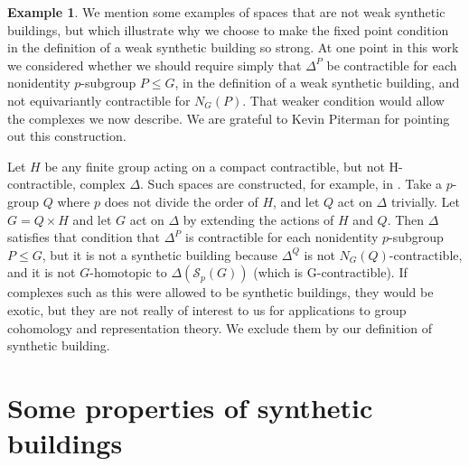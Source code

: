 \documentclass[12pt]{amsart}
\theoremstyle{plain}
\theoremstyle{definition}
\newtheorem{example}[theorem]{Example}
\theoremstyle{remark}
\numberwithin{equation}{section}
\newcommand{\SpCpx}[2]{\Delta(\mathcal{S}_{#2}(#1))}
\begin{document}
\begin{example}
We mention some examples of spaces that are not weak synthetic buildings, but which illustrate why we choose to make the fixed point condition in the definition of a weak synthetic building so strong. At one point in this work we considered whether we should require simply that $\Delta^P$ be contractible for each nonidentity $p$-subgroup $P\le G$, in the definition of a weak synthetic building, and not equivariantly contractible for $N_G(P)$. That weaker condition would allow the complexes we now describe. We are grateful to Kevin Piterman for pointing out this construction.

 Let $H$ be any finite group acting on a compact contractible, but not H-contractible, complex $\Delta$. Such spaces are constructed, for example, in \cite{Oli1976}. Take a $p$-group $Q$ where $p$ does not divide the order of $H$, and let $Q$ act on $\Delta$ trivially. Let $G= Q\times H$ and let $G$ act on $\Delta$ by extending the actions of $H$ and $Q$. Then $\Delta$ satisfies that condition that $\Delta^P$ is contractible for each nonidentity $p$-subgroup $P\le G$, but it is not a synthetic building because $\Delta^Q$ is not $N_G(Q)$-contractible, and it is not $G$-homotopic to $\SpCpx{G}{p}$ (which is G-contractible). If complexes such as this were allowed to be synthetic buildings, they would be exotic, but they are not really of interest to us for applications to group cohomology and representation theory. We exclude them by our definition of synthetic building.
\end{example}


\section{Some properties of synthetic buildings}
\label{properties-section}
\end{document}
